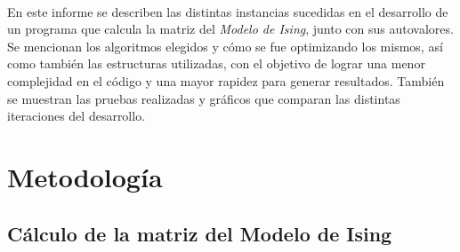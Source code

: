 \documentclass[a4paper,11pt]{article}
\begin{document}
\paragraph{}
En este informe se describen las distintas instancias sucedidas en el
desarrollo de un programa que calcula la matriz del \emph{Modelo de Ising},
junto con sus autovalores. Se mencionan los algoritmos elegidos y c\'omo se fue
optimizando los mismos, as\'i como tambi\'en las estructuras utilizadas, con el
objetivo de lograr una menor complejidad en el c\'odigo y una mayor rapidez
para generar resultados. Tambi\'en se muestran las pruebas realizadas y
gr\'aficos que comparan las distintas iteraciones del desarrollo.
\newpage
\section{Metodolog\'ia}

\subsection{C\'alculo de la matriz del Modelo de Ising}
\end{document}
